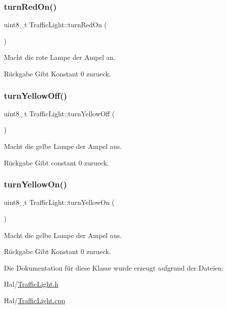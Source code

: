 \subsubsection{\texorpdfstring{turn\+Red\+On()}{turnRedOn()}}
{\footnotesize\ttfamily uint8\+\_\+t Traffic\+Light\+::turn\+Red\+On (\begin{DoxyParamCaption}{ }\end{DoxyParamCaption})}

Macht die rote Lampe der Ampel an.

\begin{DoxyReturn}{Rückgabe}
Gibt Konstant 0 zurueck. 
\end{DoxyReturn}
\hypertarget{class_traffic_light_a17723c3478b4eb754aa8b163234aa8be}{}\label{class_traffic_light_a17723c3478b4eb754aa8b163234aa8be} 
\subsubsection{\texorpdfstring{turn\+Yellow\+Off()}{turnYellowOff()}}
{\footnotesize\ttfamily uint8\+\_\+t Traffic\+Light\+::turn\+Yellow\+Off (\begin{DoxyParamCaption}{ }\end{DoxyParamCaption})}

Macht die gelbe Lampe der Ampel aus.

\begin{DoxyReturn}{Rückgabe}
Gibt constant 0 zurueck. 
\end{DoxyReturn}
\hypertarget{class_traffic_light_a74b400dafd029a2cfde6c27434111d21}{}\label{class_traffic_light_a74b400dafd029a2cfde6c27434111d21} 
\subsubsection{\texorpdfstring{turn\+Yellow\+On()}{turnYellowOn()}}
{\footnotesize\ttfamily uint8\+\_\+t Traffic\+Light\+::turn\+Yellow\+On (\begin{DoxyParamCaption}{ }\end{DoxyParamCaption})}

Macht die gelbe Lampe der Ampel aus.

\begin{DoxyReturn}{Rückgabe}
Gibt Konstant 0 zurueck. 
\end{DoxyReturn}


Die Dokumentation für diese Klasse wurde erzeugt aufgrund der Dateien\+:\begin{DoxyCompactItemize}
\item 
Hal/\hyperlink{_traffic_light_8h}{Traffic\+Light.\+h}\item 
Hal/\hyperlink{_traffic_light_8cpp}{Traffic\+Light.\+cpp}\end{DoxyCompactItemize}
